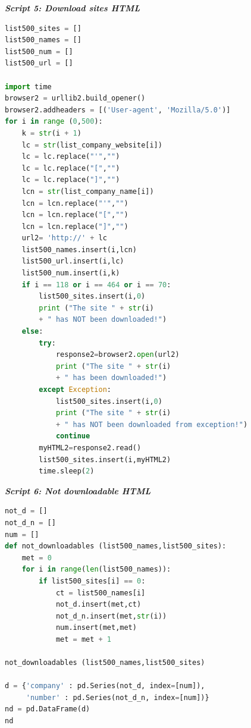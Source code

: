 \documentclass{book}
\begin{document}
\begin{center}
\textit{\textbf{Script 5: Download sites HTML}}\label{p5}
\end{center}
\begin{lstlisting}[language=Python]
list500_sites = []
list500_names = []
list500_num = []
list500_url = []

import time
browser2 = urllib2.build_opener()
browser2.addheaders = [('User-agent', 'Mozilla/5.0')]
for i in range (0,500):
    k = str(i + 1)
    lc = str(list_company_website[i])
    lc = lc.replace("'","")
    lc = lc.replace("[","")
    lc = lc.replace("]","")
    lcn = str(list_company_name[i])
    lcn = lcn.replace("'","")
    lcn = lcn.replace("[","")
    lcn = lcn.replace("]","")
    url2= 'http://' + lc
    list500_names.insert(i,lcn)
    list500_url.insert(i,lc)
    list500_num.insert(i,k)
    if i == 118 or i == 464 or i == 70:
        list500_sites.insert(i,0)  
        print ("The site " + str(i) 
        + " has NOT been downloaded!")
    else:
        try:
            response2=browser2.open(url2)
            print ("The site " + str(i) 
            + " has been downloaded!")
        except Exception:
            list500_sites.insert(i,0)
            print ("The site " + str(i) 
            + " has NOT been downloaded from exception!")           
            continue 
        myHTML2=response2.read()
        list500_sites.insert(i,myHTML2)        
        time.sleep(2)         
\end{lstlisting}

\begin{center}
\textit{\textbf{Script 6: Not downloadable HTML}}\label{p6}
\end{center}
\begin{lstlisting}[language=Python]
not_d = []
not_d_n = []
num = []
def not_downloadables (list500_names,list500_sites):
    met = 0       
    for i in range(len(list500_names)):       
        if list500_sites[i] == 0:
            ct = list500_names[i]
            not_d.insert(met,ct)
            not_d_n.insert(met,str(i))
            num.insert(met,met)
            met = met + 1

not_downloadables (list500_names,list500_sites)

d = {'company' : pd.Series(not_d, index=[num]),
     'number' : pd.Series(not_d_n, index=[num])}
nd = pd.DataFrame(d)    
nd
\end{lstlisting}
\end{document}
